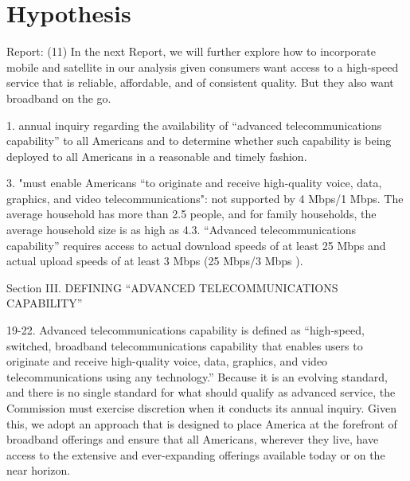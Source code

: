 \section{Hypothesis}
\label{hypothesis}

Report: (11) In the next Report, we will further explore how to incorporate mobile and satellite in our analysis given consumers want access to a high-speed service that is reliable, affordable, and of consistent quality. But they also want broadband on the go.

1. annual inquiry regarding the availability of “advanced telecommunications capability” to all Americans and to determine whether such capability is being deployed to all Americans in a reasonable and timely fashion.

3. "must enable Americans “to originate and receive high-quality voice, data, graphics, and video telecommunications": not supported by 4 Mbps/1 Mbps. The average household has more than 2.5 people, and for family households, the average household size is as high as 4.3. “Advanced telecommunications capability” requires access to actual download speeds of at least 25 Mbps and actual upload speeds of at least 3 Mbps (25 Mbps/3 Mbps ).


Section III. DEFINING “ADVANCED TELECOMMUNICATIONS CAPABILITY”
 
19-22. Advanced telecommunications capability is defined as “high-speed, switched, broadband telecommunications capability that enables users to originate and receive high-quality voice, data, graphics, and video telecommunications using any technology.” Because it is an evolving standard, and there is no single standard for what should qualify as advanced service, the Commission must exercise discretion when it conducts its annual inquiry. Given this, we adopt an approach that is designed to place America at the forefront of broadband offerings and ensure that all Americans, wherever they live, have access to the extensive and ever-expanding offerings available today or on the near horizon.

